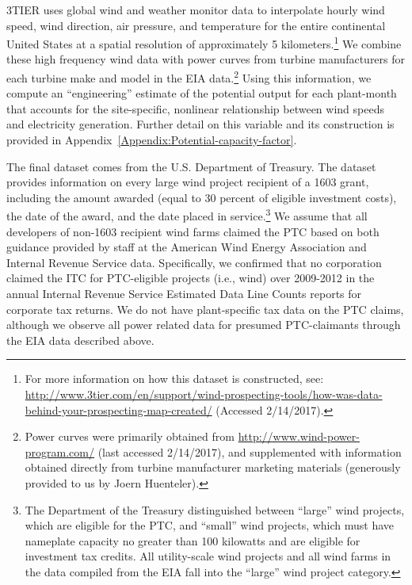 \documentclass[12pt]{article}
\begin{document}
3TIER uses global wind and weather monitor data to interpolate hourly wind speed, wind direction, air pressure, and temperature for the entire continental United States at a spatial resolution of approximately 5 kilometers.\footnote{For more information on how this dataset is constructed, see: \href{http://www.3tier.com/en/support/wind-prospecting-tools/how-was-data-behind-your-prospecting-map-created/}{http://www.3tier.com/en/support/wind-prospecting-tools/how-was-data-behind-your-prospecting-map-created/} (Accessed 2/14/2017).} We combine these high frequency wind data with power curves from turbine manufacturers for each turbine make and model in the EIA data.\footnote{Power curves were primarily obtained from \href{http://www.wind-power-program.com/}{http://www.wind-power-program.com/} (last accessed 2/14/2017), and supplemented with information obtained directly from turbine manufacturer marketing materials (generously provided to us by Joern Huenteler).} Using this information, we compute an ``engineering'' estimate of the potential output for each plant-month that accounts for the site-specific, nonlinear relationship between wind speeds and electricity generation. Further detail on this variable and its construction is provided in Appendix~\ref{Appendix:Potential-capacity-factor}.

The final dataset comes from the U.S. Department of Treasury. The dataset provides information on every large wind project recipient of a 1603 grant, including the amount awarded (equal to 30 percent of eligible investment costs), the date of the award, and the date placed in service.\footnote{The Department of the Treasury distinguished between ``large'' wind projects, which are eligible for the PTC, and ``small'' wind projects, which must have nameplate capacity no greater than 100 kilowatts and are eligible for investment tax credits. All utility-scale wind projects and all wind farms in the data compiled from the EIA fall into the ``large'' wind project category. } We assume that all developers of non-1603 recipient wind farms claimed the PTC based on both guidance provided by staff at the American Wind Energy Association and Internal Revenue Service data. Specifically, we confirmed that no corporation claimed the ITC for PTC-eligible projects (i.e., wind) over 2009-2012 in the annual Internal Revenue Service Estimated Data Line Counts reports for corporate tax returns. We do not have plant-specific tax data on the PTC claims, although we observe all power related data for presumed PTC-claimants through the EIA data described above.
\end{document}
